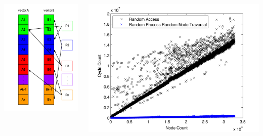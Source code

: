 \documentclass[final]{beamer}
\begin{document}
\begin{frame}[t]
\begin{columns}[t]
\begin{column}{0.60\paperwidth}
\begin{columns}[t,totalwidth=0.60\paperwidth]
\begin{column}{0.10\paperwidth}
\begin{columns}[t,totalwidth=0.10\paperwidth]
\begin{column}{0.10\paperwidth}
								\includegraphics[width=0.09\paperwidth]{img/rand_access}
							\end{column}
						\end{columns}
					\end{column}
					\begin{column}{0.24\paperwidth}
						\begin{columns}[t,totalwidth=0.22\paperwidth]
							\begin{column}{0.24\paperwidth}
								\includegraphics[width=0.26\paperwidth]{img/data/random_access}

\end{column}
\end{columns}
\end{column}
\end{columns}
\end{column}
\end{columns}
\end{frame}
\end{document}
